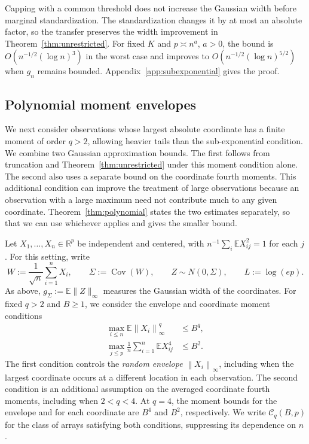 \documentclass[11pt,letterpaper]{article}
\newenvironment{recovered}{}{}
\newcommand{\vSix}[1]{{\color{magenta}#1}}
\newenvironment{vSixBlock}{\color{magenta}}{}
\theoremstyle{remark}
\newcommand{\E}{\mathbb E}
\newcommand{\R}{\mathbb R}
\newcommand{\Cov}{\operatorname{Cov}}
\newcommand{\norm}[1]{\left\lVert#1\right\rVert}
\begin{document}
\begin{recovered}
\begin{vSixBlock}
Capping with a common threshold does not increase the Gaussian
width before marginal standardization. The standardization changes
it by at most an absolute factor, so the transfer preserves the
width improvement in Theorem~\ref{thm:unrestricted}.
For fixed \(K\) and \(p\asymp n^a\), \(a>0\), the bound is
\(O(n^{-1/2}(\log n)^3)\) in the worst case and improves to
\(O(n^{-1/2}(\log n)^{5/2})\) when \(g_n\) remains bounded.
Appendix~\ref{app:subexponential} gives the proof.
\end{vSixBlock}
\end{recovered}

\subsection{Polynomial moment envelopes}\label{sec:polynomial-main}

\begin{recovered}
We next consider observations whose largest absolute coordinate has a
finite moment of order \(q>2\), allowing heavier tails than the
sub-exponential condition. We combine two Gaussian approximation
bounds. The first follows from truncation and
Theorem~\ref{thm:unrestricted} under this moment condition alone. The
second also uses a separate bound on the coordinate fourth moments.
This additional condition can improve the treatment of large
observations because an observation with a large maximum need not
contribute much to any given coordinate.
Theorem~\ref{thm:polynomial} states the two estimates separately,
so that we can use whichever applies and gives the smaller bound.
\end{recovered}

Let \(X_1,\ldots,X_n\in\R^p\) be independent and centered, with
\(n^{-1}\sum_i\E X_{ij}^2=1\) for each \(j\). For this setting, write
\begin{equation}
 W:=\frac1{\sqrt n}\sum_{i=1}^nX_i,\qquad
 \Sigma:=\Cov(W),\qquad Z\sim N(0,\Sigma),\qquad L:=\log(ep).
 \label{poly:setup}
\end{equation}
\vSix{As above, \(g_\Sigma:=\E\|Z\|_\infty\) measures the Gaussian
width of the coordinates.}
\begin{recovered}
For fixed \(q>2\) and \(B\ge1\), we consider the envelope and
coordinate moment conditions
\begin{align}
 \max_{i\le n}\E\norm{X_i}_\infty^q&\le B^q,
 \label{poly:envelope}\\
 \max_{j\le p}\frac1n\sum_{i=1}^n\E X_{ij}^4&\le B^2.
 \label{poly:fourth}
\end{align}
The first condition controls the \emph{random envelope}
\(\norm{X_i}_\infty\), including when the largest coordinate occurs
at a different location in each observation. The second condition is
an additional assumption on the averaged coordinate fourth moments,
including when \(2<q<4\). At \(q=4\), the moment bounds for
the envelope and for each coordinate are \(B^4\) and \(B^2\),
respectively. We write \(\mathcal C_q(B,p)\) for the class of arrays
satisfying both conditions, suppressing its dependence on \(n\).
\end{recovered}
\end{document}
